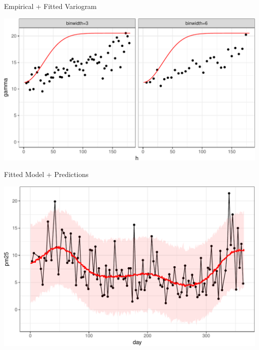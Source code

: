 \documentclass[11pt,ignorenonframetext,]{beamer}
\begin{document}
\begin{frame}{%
\protect\hypertarget{empirical-fitted-variogram}{%
Empirical + Fitted Variogram}}

\begin{center}\includegraphics[width=\textwidth]{Lec13_files/figure-beamer/unnamed-chunk-21-1} \end{center}

\end{frame}

\begin{frame}{%
\protect\hypertarget{fitted-model-predictions}{%
Fitted Model + Predictions}}

\begin{center}\includegraphics[width=\textwidth]{Lec13_files/figure-beamer/unnamed-chunk-22-1} \end{center}

\end{frame}
\end{document}
